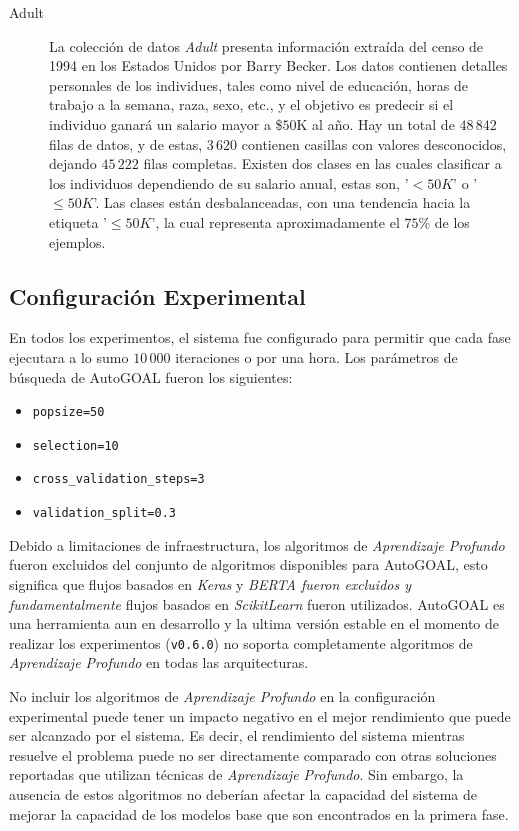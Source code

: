 \begin{description}
\item[Adult]
La colección de datos \emph{Adult} \parencite{ucidata} presenta información extraída del censo de 1994 en los Estados Unidos por Barry Becker.
Los datos contienen detalles personales de los individues, tales como nivel de educación, horas de trabajo a la semana, raza, sexo, etc., y el objetivo es predecir si el individuo ganará un salario mayor a \$$50$K al año.
Hay un total de $48\,842$ filas de datos, y de estas, $3\,620$ contienen casillas con valores desconocidos, dejando $45\,222$ filas completas.
Existen dos clases en las cuales clasificar a los individuos dependiendo de su salario anual, estas son, '$<50K$' o '$\leq50K$'.
Las clases están desbalanceadas, con una tendencia hacia la etiqueta '$\leq50K$', la cual representa aproximadamente el $75\%$ de los ejemplos.

\end{description}

\subsection{Configuración Experimental}

En todos los experimentos, el sistema fue configurado para permitir que cada fase ejecutara a lo sumo $10\,000$ iteraciones o por una hora.
Los parámetros de búsqueda de AutoGOAL fueron los siguientes:
\begin{itemize}
    \item \texttt{popsize=50}
    \item \texttt{selection=10}
    \item \texttt{cross\_validation\_steps=3}
    \item \texttt{validation\_split=0.3}
\end{itemize}

Debido a limitaciones de infraestructura, los algoritmos de \emph{Aprendizaje Profundo} fueron excluidos del conjunto de algoritmos disponibles para AutoGOAL, esto significa que flujos basados en \emph{Keras} y \emph{BERTA fueron excluidos y fundamentalmente} flujos basados en \emph{ScikitLearn} fueron utilizados.
AutoGOAL es una herramienta aun en desarrollo y la ultima versión estable en el momento de realizar los experimentos (\texttt{v0.6.0}) no soporta completamente algoritmos de  \emph{Aprendizaje Profundo} en todas las arquitecturas.

No incluir los algoritmos de \emph{Aprendizaje Profundo} en la configuración experimental puede tener un impacto negativo en el mejor rendimiento que puede ser alcanzado por el sistema.
Es decir, el rendimiento del sistema mientras resuelve el problema puede no ser directamente comparado con otras soluciones reportadas que utilizan técnicas de \emph{Aprendizaje Profundo}.
Sin embargo, la ausencia de estos algoritmos no deberían afectar la capacidad del sistema de mejorar la capacidad de los modelos base que son encontrados en la primera fase.


